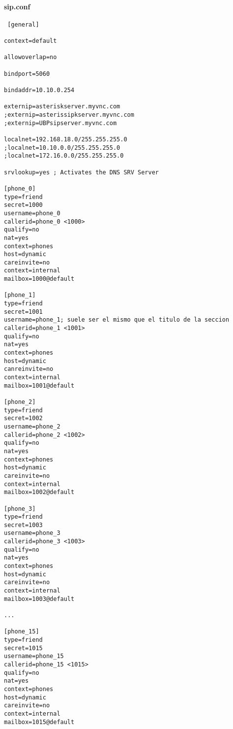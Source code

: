 \documentclass[a4paper,12pt]{report}
\newenvironment{myscriptlisting}
{\begin{list}{}{\setlength{\leftmargin}{1em}}\item\scriptsize\bfseries}
{\end{list}}
\begin{document}
\paragraph{sip.conf}
\begin{myscriptlisting}
\begin{verbatim}
 [general]

context=default

allowoverlap=no

bindport=5060 

bindaddr=10.10.0.254

externip=asteriskserver.myvnc.com
;externip=asterissipkserver.myvnc.com
;externip=UBPsipserver.myvnc.com

localnet=192.168.18.0/255.255.255.0
;localnet=10.10.0.0/255.255.255.0
;localnet=172.16.0.0/255.255.255.0

srvlookup=yes ; Activates the DNS SRV Server

[phone_0]
type=friend
secret=1000
username=phone_0 
callerid=phone_0 <1000> 
qualify=no
nat=yes
context=phones
host=dynamic
careinvite=no
context=internal
mailbox=1000@default

[phone_1]
type=friend 
secret=1001
username=phone_1; suele ser el mismo que el titulo de la seccion 
callerid=phone_1 <1001> 
qualify=no
nat=yes
context=phones
host=dynamic
canreinvite=no         
context=internal  
mailbox=1001@default
 
[phone_2]
type=friend
secret=1002
username=phone_2 
callerid=phone_2 <1002> 
qualify=no
nat=yes
context=phones
host=dynamic
careinvite=no
context=internal
mailbox=1002@default

[phone_3]
type=friend
secret=1003
username=phone_3 
callerid=phone_3 <1003> 
qualify=no
nat=yes
context=phones
host=dynamic
careinvite=no
context=internal
mailbox=1003@default

...

[phone_15]
type=friend
secret=1015
username=phone_15
callerid=phone_15 <1015> 
qualify=no
nat=yes
context=phones
host=dynamic
careinvite=no
context=internal
mailbox=1015@default
\end{verbatim}
\end{myscriptlisting}
\end{document}
